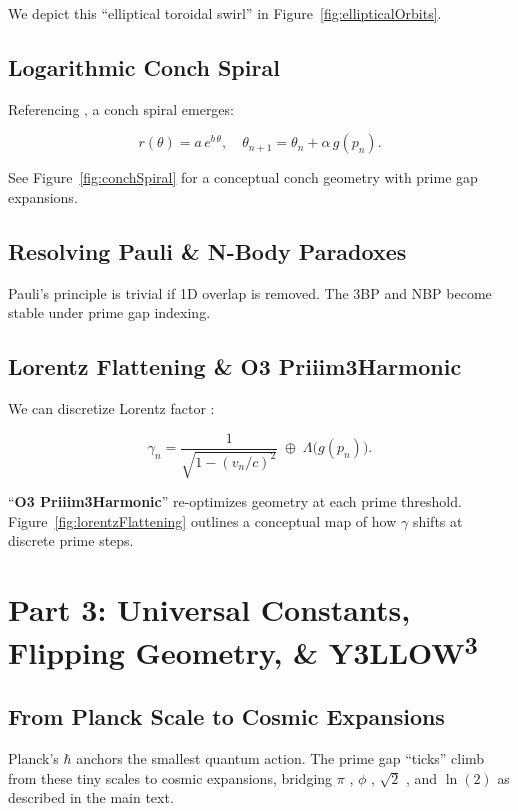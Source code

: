 \documentclass[11pt]{article}
\begin{document}
We depict this “elliptical toroidal swirl” in Figure~\ref{fig:ellipticalOrbits}.

\subsection{Logarithmic Conch Spiral}
Referencing \cite{Hardy1979}, a conch spiral emerges:

$$
r(\theta) = a \, e^{b\,\theta}, \quad
\theta_{n+1} = \theta_n + \alpha\,g(p_n).
$$

See Figure~\ref{fig:conchSpiral} for a conceptual conch geometry with prime gap expansions.

\subsection{Resolving Pauli \& N-Body Paradoxes}
Pauli’s principle \cite{Pauli1925} is trivial if 1D overlap is removed. The 3BP \cite{Poincare1892} and NBP become stable under prime gap indexing.

\subsection{Lorentz Flattening \& O3 Priiim3Harmonic}
We can discretize Lorentz factor \cite{Lorentz1904}:

$$
\gamma_{n} 
= \frac{1}{\sqrt{1-(v_n/c)^2}} \;\oplus\; \Lambda\bigl(g(p_n)\bigr).
$$

“\textbf{O3 Priiim3Harmonic}” re-optimizes geometry at each prime threshold. Figure~\ref{fig:lorentzFlattening} outlines a conceptual map of how $\gamma$ shifts at discrete prime steps.

\clearpage

\section{Part 3: Universal Constants, Flipping Geometry, \& Y3LLOW\textsuperscript{3}}
\label{part3}

\subsection{From Planck Scale to Cosmic Expansions}
Planck’s $\hbar$ \cite{Planck1900} anchors the smallest quantum action. The prime gap “ticks” climb from these tiny scales to cosmic expansions, bridging $\pi$ \cite{Archimedes287BC}, $\phi$ \cite{Fibonacci1202}, $\sqrt{2}$ \cite{Pythagoras500BC}, and $\ln(2)$ \cite{Euler1736} as described in the main text.
\end{document}
